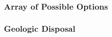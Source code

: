 
\begin{frame}[ctb!]
    \frametitle{Array of Possible Options}
    
  \end{frame}

\begin{frame}[ctb!]
    \frametitle{Geologic Disposal}
    
  \end{frame} 
